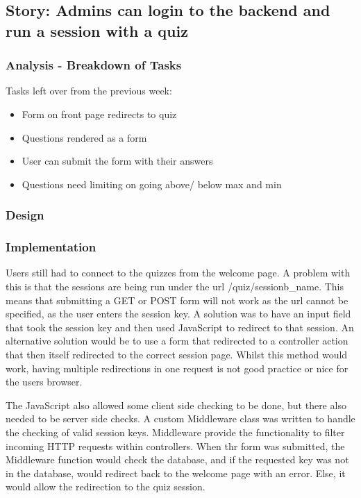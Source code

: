 \subsection{Story: Admins can login to the backend and run a session with a quiz}
\subsubsection{Analysis - Breakdown of Tasks}
Tasks left over from the previous week:
\begin{itemize}
	\item Form on front page redirects to quiz
	\item Questions rendered as a form
	\item User can submit the form with their answers
	\item Questions need limiting on going above/ below max and min
\end{itemize}
\subsubsection{Design}
\subsubsection{Implementation}
Users still had to connect to the quizzes from the welcome page. A problem with this is that the sessions are being run under the url /quiz/sessionb\_name. This means that submitting a GET or POST form will not work as the url cannot be specified, as the user enters the session key. A solution was to have an input field that took the session key and then used JavaScript to redirect to that session. An alternative solution would be to use a form that redirected to a controller action that then itself redirected to the correct session page. Whilst this method would work, having multiple redirections in one request is not good practice or nice for the users browser.

The JavaScript also allowed some client side checking to be done, but there also needed to be server side checks. A custom Middleware class was written to handle the checking of valid session keys. Middleware provide the functionality to filter incoming HTTP requests within controllers\cite{laravel-middleware}. When thr form was submitted, the Middleware function would check the database, and if the requested key was not in the database, would redirect back to the welcome page with an error. Else, it would allow the redirection to the quiz session.

